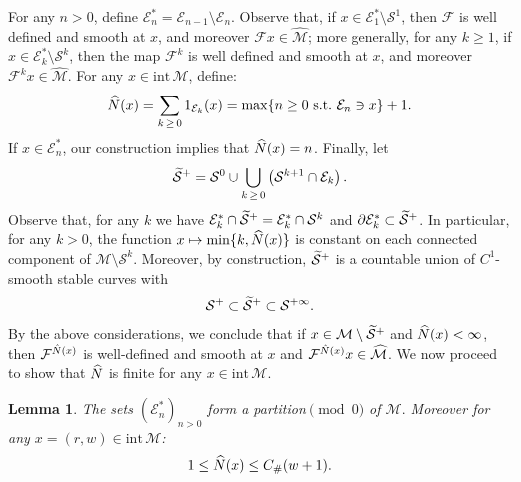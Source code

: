 \documentclass[10pt]{amsart}
\newtheorem{lemm}[theo]{Lemma}\newtheorem{prop}[theo]{Proposition}\newtheorem{coro}[theo]{Corollary}\newtheorem{conj}[theo]{Conjecture}
\theoremstyle{definition}\newtheorem{defi}[theo]{Definition}\newtheorem{rema}[theo]{Remark}\newtheorem{exam}[theo]{Example}\newtheorem{exem}[theo]{Example}\newtheorem{nota}[theo]{Notation}
\newcommand{\st}{\ \text{s.t.}\ }
\newcommand{\intr}[1]{\mathrm{int}\,#1}
\newcommand{\cE}{\mathcal E}
\newcommand{\cEs}{\mathcal E^{*}}
\newcommand{\cm}{\mathcal{F}}
\newcommand{\csp}{\mathcal{M}}
\newcommand{\cspi}{\widehat{\csp}}
\newcommand{\singPrivate}{\mathcal{S}}
\newcommand{\sing}[1]{\singPrivate^{#1}}
\newcommand{\singForward}[1]{\singPrivate^+_{#1}}
\newcommand{\singt}[1]{\tilde{\singPrivate}^{#1}}
\newcommand{\Np}{\hat N}
\newcommand{\Const}{C_\#}
\let\oldtilde\tilde
\renewcommand*{\tilde}[1]{\mathchoice{\widetilde{#1}}{\widetilde{#1}}{\oldtilde{#1}}{\oldtilde{#1}}}
\let\oldhat\hat
\renewcommand*{\hat}[1]{\mathchoice{\widehat{#1}}{\widehat{#1}}{\oldhat{#1}}{\oldhat{#1}}}
\begin{document}
For any $n > 0$, define $\cEs_n = \cE_{n-1}\setminus\cE_{n}$. Observe that, if $x\in\cEs_1\setminus\sing{1}$, then $\cm$ is well defined and smooth at $x$, and moreover $\cm x\in\cspi$; more generally, for any $k\ge 1$, if $x\in\cEs_{k}\setminus\sing{k}$, then the map $\cm^k$ is well defined and smooth at $x$, and moreover $\cm^kx\in\cspi$. For any $x\in\intr\csp$, define:
\begin{align*}
\Np(x) = \sum_{k\,\ge\,0} 1_{\cE_k}(x) = \max\{n\ge0\st \cE_n\ni x\} +1.
\end{align*}
If $x\in\cEs_n$, our construction implies that $\Np(x) = n$. Finally, let
\begin{align*}
\singt+ = \sing0\cup \bigcup_{k\,\ge\,0} \left(\sing{k+1}\cap \cE_k\right).
\end{align*}
Observe that, for any $k$ we have $\cEs_{k}\cap\singt+ = \cEs_{k}\cap\sing{k}$ and $\partial\cEs_{k}\subset\singt+$. In particular, for any $k > 0$, the function $x\mapsto\min\{k,\Np(x)\}$ is constant on each connected component of $\csp\setminus\sing{k}$. Moreover, by construction, $\singt+$ is a countable union of $C^1$-smooth stable curves with
\begin{align*}
\singForward{}\subset\singt+\subset\sing{+\infty}.
\end{align*}
By the above considerations, we conclude that if $x\in\csp\setminus\singt+$ and $\Np(x) < \infty$, then $\cm^{\Np(x)}$ is well-defined and smooth at $x$ and $\cm^{\Np(x)}x\in\cspi$. We now proceed to show that $\Np$ is finite for any $x\in\intr\csp$.
\begin{lemm} \label{LmFRet}
The sets $(\cEs_n)_{n > 0}$ form a partition$\pmod0$ of $\csp.$ Moreover for any $x = (r,w)\in\intr\csp$:
\begin{align}\label{e_weakBoundOnNp}
1\le\Np(x)\le \Const (w+1).
\end{align}
\end{lemm}
\end{document}
